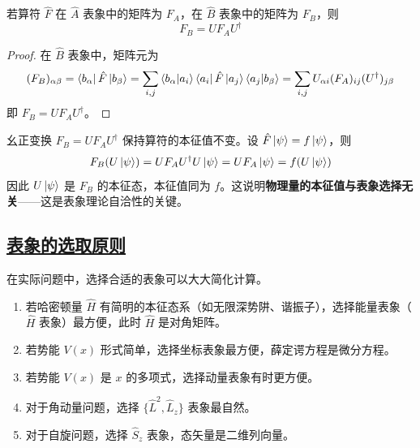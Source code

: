 \begin{theorem}[算符的表象变换]
    若算符 $\hat{F}$ 在 $\hat{A}$ 表象中的矩阵为 $F_A$，在 $\hat{B}$ 表象中的矩阵为 $F_B$，则
    \begin{equation}
        F_B = UF_AU^\dagger
    \end{equation}
\end{theorem}

\begin{proof}
    在 $\hat{B}$ 表象中，矩阵元为
    \begin{equation}
        (F_B)_{\alpha\beta} = \bra{b_\alpha}\hat{F}\ket{b_\beta} = \sum_{i,j}\braket{b_\alpha}{a_i}\bra{a_i}\hat{F}\ket{a_j}\braket{a_j}{b_\beta} = \sum_{i,j}U_{\alpha i}(F_A)_{ij}(U^\dagger)_{j\beta}
    \end{equation}
    即 $F_B = UF_AU^\dagger$。
\end{proof}

\begin{remark}
    幺正变换 $F_B = UF_AU^\dagger$ 保持算符的本征值不变。设 $\hat{F}\ket{\psi} = f\ket{\psi}$，则
    \begin{equation}
        F_B(U\ket{\psi}) = UF_AU^\dagger U\ket{\psi} = UF_A\ket{\psi} = f(U\ket{\psi})
    \end{equation}
    因此 $U\ket{\psi}$ 是 $F_B$ 的本征态，本征值同为 $f$。这说明\textbf{物理量的本征值与表象选择无关}——这是表象理论自洽性的关键。
\end{remark}

\subsection{\protect\hyperlink{:}{表象的选取原则}}

在实际问题中，选择合适的表象可以大大简化计算。

\begin{enumerate}
    \item 若哈密顿量 $\hat{H}$ 有简明的本征态系（如无限深势阱、谐振子），选择能量表象（$\hat{H}$ 表象）最方便，此时 $\hat{H}$ 是对角矩阵。
    \item 若势能 $V(x)$ 形式简单，选择坐标表象最方便，薛定谔方程是微分方程。
    \item 若势能 $V(x)$ 是 $x$ 的多项式，选择动量表象有时更方便。
    \item 对于角动量问题，选择 $\{\hat{L}^2, \hat{L}_z\}$ 表象最自然。
    \item 对于自旋问题，选择 $\hat{S}_z$ 表象，态矢量是二维列向量。
\end{enumerate}

